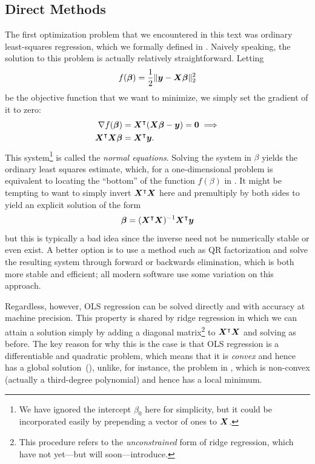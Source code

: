 \subsection{Direct Methods}

The first optimization problem that we encountered in this text was ordinary least-squares regression, which we formally defined in . Naively speaking, the solution to this problem is actually relatively straightforward. Letting
\[
  f(\boldsymbol{\beta}) = \frac{1}{2}\lVert \boldsymbol{y} - \boldsymbol{X}\boldsymbol{\beta}\rVert_2^2
\]
be the objective function that we want to minimize, we simply set the gradient of it to zero:
\[
  \begin{aligned}
    \nabla f(\boldsymbol{\beta})                & = \boldsymbol{X}^\intercal (\boldsymbol{X}\boldsymbol{\beta} - \boldsymbol{y}) = \boldsymbol{0} \implies \\
    \boldsymbol{X}^\intercal \boldsymbol{X}\boldsymbol{\beta} & = \boldsymbol{X}^\intercal \boldsymbol{y}.
  \end{aligned}
\]
This system\footnote{We have ignored the intercept \(\beta_0\) here for simplicity, but it could be incorporated easily by prepending a vector of ones to \(\boldsymbol{X}\).} is called the \emph{normal equations}. Solving the system in \(\beta\) yields the ordinary least squares estimate, which, for a one-dimensional problem is equivalent to locating the ``bottom'' of the function \(f(\beta)\) in . It might be tempting to want to simply invert \(\boldsymbol{X}^\intercal\boldsymbol{X}\) here and premultiply by both sides to yield an explicit solution of the form
\[
  \boldsymbol{\beta} = (\boldsymbol{X}^\intercal\boldsymbol{X})^{-1}\boldsymbol{X}^\intercal\boldsymbol{y}
\]
but this is typically a bad idea since the inverse need not be numerically stable or even exist. A better option is to use a method such as QR factorization and solve the resulting system through forward or backwards elimination, which is both more stable and efficient; all modern software use some variation on this approach.

Regardless, however, OLS regression can be solved directly and with accuracy at machine precision. This property is shared by ridge regression in which we can attain a solution simply by adding a diagonal matrix\footnote{This procedure refers to the \emph{unconstrained} form of ridge regression, which have not yet---but will soon---introduce.} to \(\boldsymbol{X}^\intercal\boldsymbol{X}\) and solving as before. The key reason for why this is the case is that OLS regression is a differentiable and quadratic problem, which means that it is \emph{convex} and hence has a global solution~(), unlike, for instance, the problem in , which is non-convex (actually a third-degree polynomial) and hence has a local minimum.

